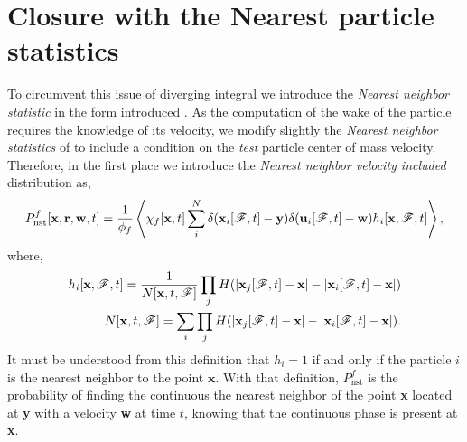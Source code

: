 \section{Closure with the Nearest particle statistics}

To circumvent this issue of diverging integral we introduce the \textit{Nearest neighbor statistic} in the form introduced \citet{zhang2021ensemble}. 
As the computation of the wake of the particle requires the knowledge of its velocity, we modify slightly the \textit{Nearest neighbor statistics} of \citet{zhang2021ensemble} to include a condition on the \textit{test } particle center of mass velocity.
Therefore, in the first place we introduce the \textit{Nearest neighbor velocity included} distribution as, 
\begin{equation}
    P_\text{nst}^f[\textbf{x},\textbf{r},\textbf{w},t]
    = \frac{1}{\phi_f}\left<
        \chi_f[\textbf{x},t]
        \sum_i^N 
        \delta(\textbf{x}_i[\mathscr{F},t]-\textbf{y})
        \delta(\textbf{u}_i[\mathscr{F},t]-\textbf{w})
        h_i[\textbf{x},\mathscr{F},t]
    \right>,
\end{equation}
where,
\begin{align}
    \label{eq:h_i_def}
    h_i[\textbf{x},\FF,t]
    = \frac{1}{N[\textbf{x},t,\FF]}
    \prod_j H(|\textbf{x}_j[\FF,t] - \textbf{x}| - |\textbf{x}_i[\FF,t] - \textbf{x}|)\\
    \label{eq:N_def}
    N[\textbf{x},t,\FF]
    = \sum_i\prod_jH(|\textbf{x}_j[\FF,t] - \textbf{x}| - |\textbf{x}_i[\FF,t] - \textbf{x}|).
\end{align}
It must be understood from this definition that $h_i=1$ if and only if the particle $i$ is the nearest neighbor to the point $\textbf{x}$. 
With that definition, $P_\text{nst}^f$ is the probability of finding the continuous the nearest neighbor of the point \textbf{x} located at \textbf{y} with a velocity \textbf{w} at time $t$, knowing that the continuous phase is present at \textbf{x}. 

